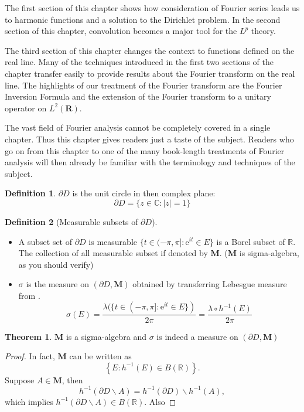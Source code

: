 \documentclass[12pt]{book}
\theoremstyle{definition}
\newtheorem{definition}{Definition}[chapter]
\newtheorem{theorem}{Theorem}[chapter]
\newcommand{\R}{\mathbb{R}}
\newcommand{\C}{\mathbb{C}}
\newcommand{\E}{\mathrm{e}}
\begin{document}
The first section of this chapter shows how consideration of Fourier series leads us to harmonic functions and a solution to the Dirichlet problem. In the second section of this chapter, convolution becomes a major tool for the $L^p$ theory.

The third section of this chapter changes the context to functions defined on the real line. Many of the techniques introduced in the first two sections of the chapter transfer easily to provide results about the Fourier transform on the real line. The highlights of our treatment of the Fourier transform are the Fourier Inversion Formula and the extension of the Fourier transform to a unitary operator on $L^2(\mathbf{R})$.

The vast field of Fourier analysis cannot be completely covered in a single chapter. Thus this chapter gives readers just a taste of the subject. Readers who go on from this chapter to one of the many book-length treatments of Fourier analysis will then already be familiar with the terminology and techniques of the subject.
\newpage
\begin{definition}
$\partial D$ is the unit circle in then complex plane:
$$
\partial D = \{z\in \C: |z|=1 \}
$$
\end{definition}

\begin{definition}[Measurable subsets of $\partial D$]\label{Curve Measure} \ 
\begin{itemize}
	\item A subset set of $\partial D$ is measurable $\{t\in(-\pi,\pi]: \E^{it}\in E \}$ is a Borel subset of $\R$. The collection of all measurable subset if denoted by $\mathbf M$. ($\mathbf M$ is sigma-algebra, as you should verify)
	\item $\sigma$ is the measure on $(\partial D,\mathbf M)$ obtained by transferring Lebesgue measure from .
	$$
	\sigma(E)=\frac{\lambda(\{ t\in(-\pi,\pi]: \E^{it}\in E\})}{2\pi}=\frac{\lambda \circ h^{-1}(E)}{2\pi}	$$
\end{itemize}
\end{definition}

\begin{theorem}
$\mathbf{M}$ is a sigma-algebra and $\sigma$ is indeed a measure on $(\partial D,\mathbf{M})$
\end{theorem}
\begin{proof}
In fact, $\mathbf{M}$ can be written as 
$$
\left\{E: h^{-1}(E)\in B(\R) \right\}.
$$	
Suppose $A \in \mathbf{M}$, then 
$$
h^{-1}(\partial D\backslash A) = h^{-1}(\partial D)\backslash h^{-1}(A),
$$
which implies $h^{-1}(\partial D\backslash A) \in B(\R)$. Also
\end{proof}
\end{document}
